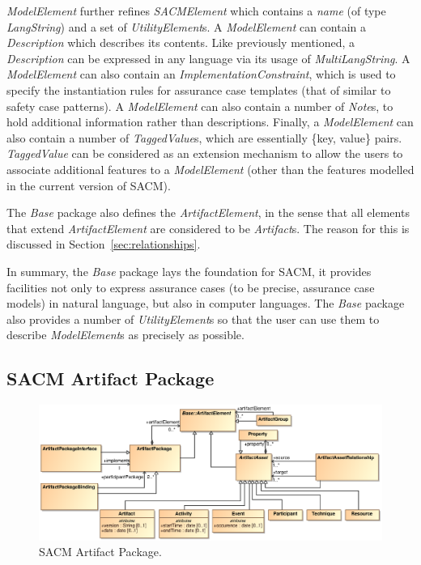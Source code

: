 \textit{ModelElement} further refines \textit{SACMElement} which contains a \textit{name} (of type \textit{LangString}) and a set of \textit{UtilityElement}s. 
A \textit{ModelElement} can contain a \textit{Description} which describes its contents. Like previously mentioned, a \textit{Description} can be expressed in any language via its usage of \textit{MultiLangString}. 
A \textit{ModelElement} can also contain an \textit{ImplementationConstraint}, which is used to specify the instantiation rules for assurance case templates (that of similar to safety case patterns).
A \textit{ModelElement} can also contain a number of \textit{Note}s, to hold additional information rather than descriptions. 
Finally, a \textit{ModelElement} can also contain a number of \textit{TaggedValue}s, which are essentially \{key, value\} pairs. 
\textit{TaggedValue} can be considered as an extension mechanism to allow the users to associate additional features to a \textit{ModelElement} (other than the features modelled in the current version of SACM).

The \textit{Base} package also defines the \textit{ArtifactElement}, in the sense that all elements that extend \textit{ArtifactElement} are considered to be \textit{Artifact}s. 
The reason for this is discussed in Section~\ref{sec:relationships}. 

In summary, the \textit{Base} package lays the foundation for SACM, it provides facilities not only to express assurance cases (to be precise, assurance case models) in natural language, but also in computer languages. 
The \textit{Base} package also provides a number of \textit{UtilityElement}s so that the user can use them to describe \textit{ModelElement}s as precisely as possible.

\subsection{SACM Artifact Package}
\label{sec:artiPack}
\begin{figure}
	\centering
	\includegraphics[width=1\linewidth]{Artifact.eps}
	\caption{SACM Artifact Package.}
	\label{fig:arti}
\end{figure}

